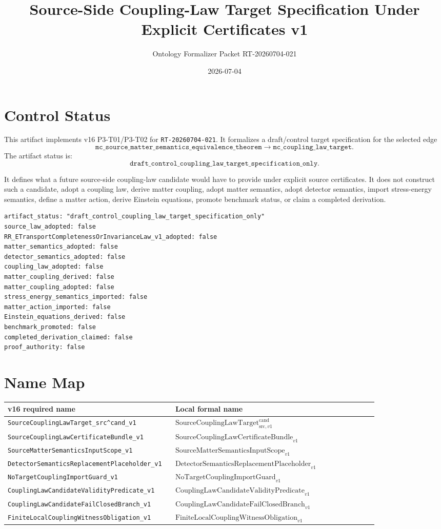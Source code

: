 \documentclass[11pt]{article}
\title{Source-Side Coupling-Law Target Specification Under Explicit Certificates v1}
\author{Ontology Formalizer Packet RT-20260704-021}
\date{2026-07-04}
\newcommand{\SCLTarget}{\mathrm{SourceCouplingLawTarget}^{\mathrm{cand}}_{\mathrm{src},v1}}
\newcommand{\SCLBundle}{\mathrm{SourceCouplingLawCertificateBundle}_{v1}}
\newcommand{\SMScope}{\mathrm{SourceMatterSemanticsInputScope}_{v1}}
\newcommand{\DetPlaceholder}{\mathrm{DetectorSemanticsReplacementPlaceholder}_{v1}}
\newcommand{\NTGuard}{\mathrm{NoTargetCouplingImportGuard}_{v1}}
\newcommand{\Validity}{\mathrm{CouplingLawCandidateValidityPredicate}_{v1}}
\newcommand{\FailBranch}{\mathrm{CouplingLawCandidateFailClosedBranch}_{v1}}
\newcommand{\WitnessOb}{\mathrm{FiniteLocalCouplingWitnessObligation}_{v1}}
\begin{document}
\maketitle

\section{Control Status}

This artifact implements v16 P3-T01/P3-T02 for
\texttt{RT-20260704-021}. It formalizes a draft/control target specification
for the selected edge
\[
  \texttt{mc\_source\_matter\_semantics\_equivalence\_theorem}
  \longrightarrow
  \texttt{mc\_coupling\_law\_target}.
\]
The artifact status is:
\[
  \texttt{draft\_control\_coupling\_law\_target\_specification\_only}.
\]

It defines what a future source-side coupling-law candidate would have to
provide under explicit source certificates. It does not construct such a
candidate, adopt a coupling law, derive matter coupling, adopt matter
semantics, adopt detector semantics, import stress-energy semantics, define a
matter action, derive Einstein equations, promote benchmark status, or claim a
completed derivation.

\begin{verbatim}
artifact_status: "draft_control_coupling_law_target_specification_only"
source_law_adopted: false
RR_ETransportCompletenessOrInvarianceLaw_v1_adopted: false
matter_semantics_adopted: false
detector_semantics_adopted: false
coupling_law_adopted: false
matter_coupling_derived: false
matter_coupling_adopted: false
stress_energy_semantics_imported: false
matter_action_imported: false
Einstein_equations_derived: false
benchmark_promoted: false
completed_derivation_claimed: false
proof_authority: false
\end{verbatim}

\section{Name Map}

\begin{longtable}{p{0.32\linewidth}p{0.52\linewidth}}
\toprule
v16 required name & Local formal name \\
\midrule
\texttt{SourceCouplingLawTarget\_src\^{}cand\_v1} & \(\SCLTarget\) \\
\texttt{SourceCouplingLawCertificateBundle\_v1} & \(\SCLBundle\) \\
\texttt{SourceMatterSemanticsInputScope\_v1} & \(\SMScope\) \\
\texttt{DetectorSemanticsReplacementPlaceholder\_v1} & \(\DetPlaceholder\) \\
\texttt{NoTargetCouplingImportGuard\_v1} & \(\NTGuard\) \\
\texttt{CouplingLawCandidateValidityPredicate\_v1} & \(\Validity\) \\
\texttt{CouplingLawCandidateFailClosedBranch\_v1} & \(\FailBranch\) \\
\texttt{FiniteLocalCouplingWitnessObligation\_v1} & \(\WitnessOb\) \\
\bottomrule
\end{longtable}
\end{document}
